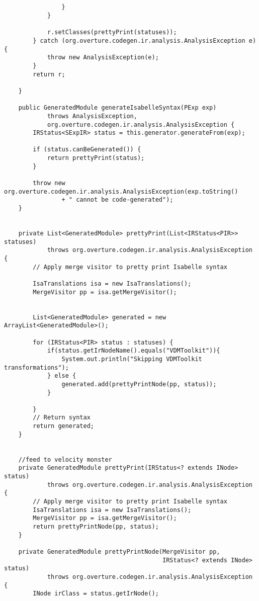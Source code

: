 \begin{appendices}
\begin{lstlisting}
                    
                    
                }
            }

            r.setClasses(prettyPrint(statuses));
        } catch (org.overture.codegen.ir.analysis.AnalysisException e) {
            throw new AnalysisException(e);
        }
        return r;

    }

    public GeneratedModule generateIsabelleSyntax(PExp exp)
            throws AnalysisException,
            org.overture.codegen.ir.analysis.AnalysisException {
        IRStatus<SExpIR> status = this.generator.generateFrom(exp);

        if (status.canBeGenerated()) {
            return prettyPrint(status);
        }

        throw new org.overture.codegen.ir.analysis.AnalysisException(exp.toString()
                + " cannot be code-generated");
    }


    private List<GeneratedModule> prettyPrint(List<IRStatus<PIR>> statuses)
            throws org.overture.codegen.ir.analysis.AnalysisException {
        // Apply merge visitor to pretty print Isabelle syntax
      
        IsaTranslations isa = new IsaTranslations();
        MergeVisitor pp = isa.getMergeVisitor();
        
       
        List<GeneratedModule> generated = new ArrayList<GeneratedModule>();

        for (IRStatus<PIR> status : statuses) {
            if(status.getIrNodeName().equals("VDMToolkit")){
                System.out.println("Skipping VDMToolkit transformations");
            } else {
                generated.add(prettyPrintNode(pp, status));
            }

        }
        // Return syntax
        return generated;
    }

    
    //feed to velocity monster
    private GeneratedModule prettyPrint(IRStatus<? extends INode> status)
            throws org.overture.codegen.ir.analysis.AnalysisException {
        // Apply merge visitor to pretty print Isabelle syntax
        IsaTranslations isa = new IsaTranslations();
        MergeVisitor pp = isa.getMergeVisitor();
        return prettyPrintNode(pp, status);
    }

    private GeneratedModule prettyPrintNode(MergeVisitor pp,
                                            IRStatus<? extends INode> status)
            throws org.overture.codegen.ir.analysis.AnalysisException {
        INode irClass = status.getIrNode();


\end{lstlisting}
\end{appendices}
